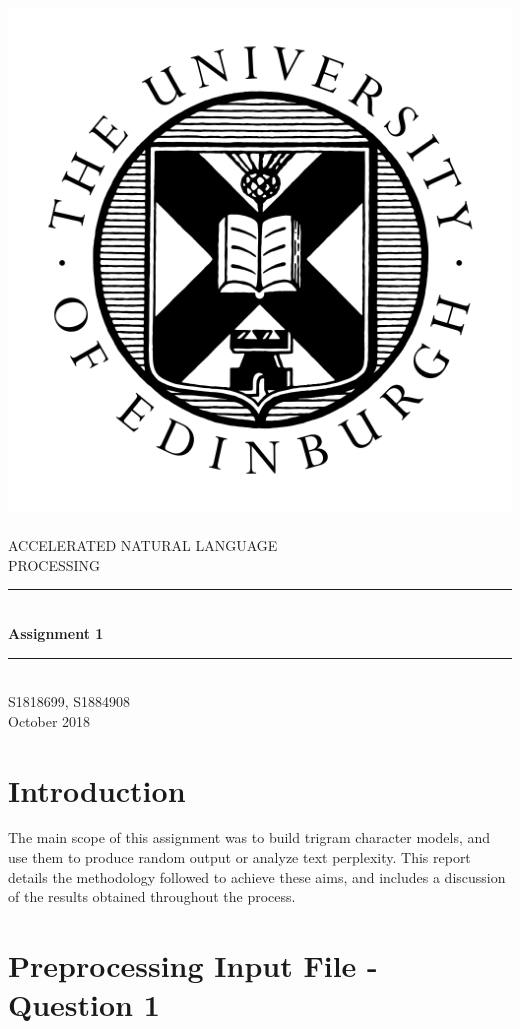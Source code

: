 \documentclass[12pt]{article}
\begin{document}
	
	
\begin{titlepage}
	\newcommand{\HRule}{\rule{\linewidth}{0.5mm}} %
	\center %
	\includegraphics[width = 0.3 \linewidth]{"./graphics/avatar-roundel-blackonwhite"}\\[0.5cm]
	\textsc{\\[1cm]\LARGE ACCELERATED NATURAL LANGUAGE \\
             \hfill\break PROCESSING}\\[2cm]

	\HRule \\[0.4cm]
	{ \huge \bfseries Assignment 1}\\[0.1cm]
	\HRule \\[1.5cm]
	\Large
	\vfill
	 S1818699, S1884908\\[0.5cm]
	{\large October 2018}
\end{titlepage}
\setlength\parindent{0pt}		
\newpage

\tableofcontents

\newpage
	
\section{Introduction}
The main scope of this assignment was to build trigram character models, and use them to produce random output or analyze text perplexity.  This report details the methodology followed to achieve these aims, and includes a discussion of the results obtained throughout the process.
\section{Preprocessing Input File - Question 1}
\end{document}
